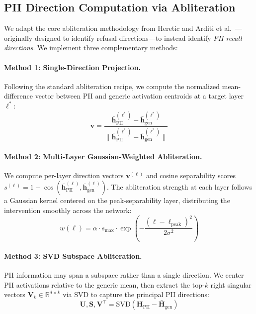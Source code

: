 \documentclass[11pt]{article}
\begin{document}
\subsection{PII Direction Computation via Abliteration}

We adapt the core abliteration methodology from Heretic \citep{heretic2025} and Arditi et al.\ \citep{arditi2024refusal}---originally designed to identify refusal directions---to instead identify \textit{PII recall directions}. We implement three complementary methods:

\paragraph{Method 1: Single-Direction Projection.} Following the standard abliteration recipe, we compute the normalized mean-difference vector between PII and generic activation centroids at a target layer $\ell^*$:
\begin{equation}
\mathbf{v} = \frac{\bar{\mathbf{h}}_{\text{PII}}^{(\ell^*)} - \bar{\mathbf{h}}_{\text{gen}}^{(\ell^*)}}{\|\bar{\mathbf{h}}_{\text{PII}}^{(\ell^*)} - \bar{\mathbf{h}}_{\text{gen}}^{(\ell^*)}\|}
\end{equation}

\paragraph{Method 2: Multi-Layer Gaussian-Weighted Abliteration.} We compute per-layer direction vectors $\mathbf{v}^{(\ell)}$ and cosine separability scores $s^{(\ell)} = 1 - \cos(\bar{\mathbf{h}}_{\text{PII}}^{(\ell)}, \bar{\mathbf{h}}_{\text{gen}}^{(\ell)})$. The abliteration strength at each layer follows a Gaussian kernel centered on the peak-separability layer, distributing the intervention smoothly across the network:
\begin{equation}
w(\ell) = \alpha \cdot s_{\max} \cdot \exp\!\left(-\frac{(\ell - \ell_{\text{peak}})^2}{2\sigma^2}\right)
\end{equation}

\paragraph{Method 3: SVD Subspace Abliteration.} PII information may span a subspace rather than a single direction. We center PII activations relative to the generic mean, then extract the top-$k$ right singular vectors $\mathbf{V}_k \in \mathbb{R}^{d \times k}$ via SVD to capture the principal PII directions:
\begin{equation}
\mathbf{U}, \mathbf{S}, \mathbf{V}^{\top} = \text{SVD}\!\left(\mathbf{H}_{\text{PII}} - \bar{\mathbf{H}}_{\text{gen}}\right)
\end{equation}
\end{document}
